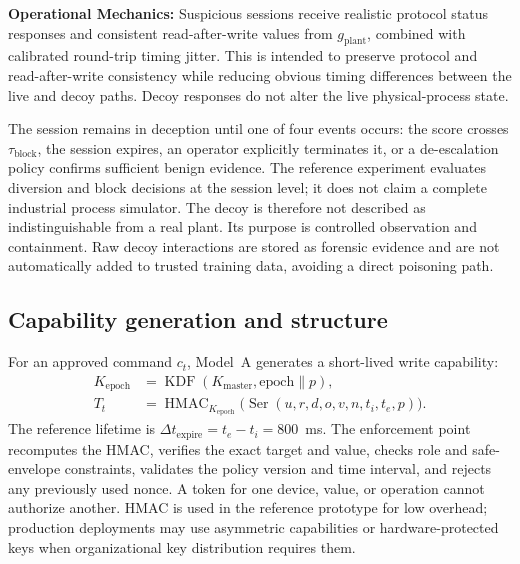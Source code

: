 \documentclass[journal]{IEEEtran}
\DeclareMathOperator{\KDF}{KDF}
\DeclareMathOperator{\Ser}{Ser}
\DeclareMathOperator{\HMAC}{HMAC}
\begin{document}
\noindent\textbf{Operational Mechanics:} Suspicious sessions receive realistic protocol status responses and consistent read-after-write values from $g_{\mathrm{plant}}$, combined with calibrated round-trip timing jitter. This is intended to preserve protocol and read-after-write consistency while reducing obvious timing differences between the live and decoy paths. Decoy responses do not alter the live physical-process state.

The session remains in deception until one of four events occurs: the score crosses $\tau_{\mathrm{block}}$, the session expires, an operator explicitly terminates it, or a de-escalation policy confirms sufficient benign evidence. The reference experiment evaluates diversion and block decisions at the session level; it does not claim a complete industrial process simulator. The decoy is therefore not described as indistinguishable from a real plant. Its purpose is controlled observation and containment. Raw decoy interactions are stored as forensic evidence and are not automatically added to trusted training data, avoiding a direct poisoning path.

\subsection{Capability generation and structure}
For an approved command $c_t$, Model~A generates a short-lived write capability:
\begin{subequations}
\begin{align}
 K_{\mathrm{epoch}} &= \KDF(K_{\mathrm{master}}, \mathrm{epoch} \parallel p), \\
 T_t &= \HMAC_{K_{\mathrm{epoch}}}\bigl(\Ser(u, r, d, o, v, n, t_i, t_e, p)\bigr).
\end{align}
\end{subequations}
The reference lifetime is $\Delta t_{\mathrm{expire}} = t_e - t_i = 800$~ms. The enforcement point recomputes the HMAC, verifies the exact target and value, checks role and safe-envelope constraints, validates the policy version and time interval, and rejects any previously used nonce. A token for one device, value, or operation cannot authorize another. HMAC is used in the reference prototype for low overhead; production deployments may use asymmetric capabilities or hardware-protected keys when organizational key distribution requires them.
\end{document}
